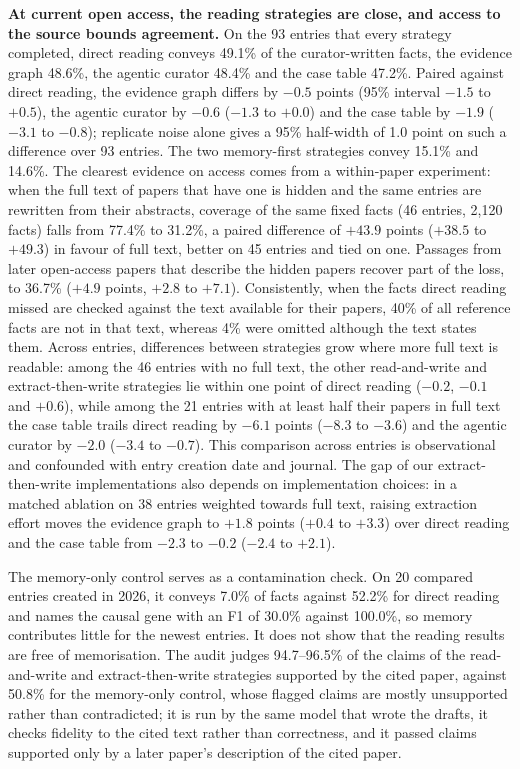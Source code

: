 \documentclass{article} %
\begin{document}
\textbf{At current open access, the reading strategies are close, and access to the source bounds agreement.} On the 93 entries that every strategy completed, direct reading conveys 49.1\% of the curator-written facts, the evidence graph 48.6\%, the agentic curator 48.4\% and the case table 47.2\%. Paired against direct reading, the evidence graph differs by $-0.5$ points (95\% interval $-1.5$ to $+0.5$), the agentic curator by $-0.6$ ($-1.3$ to $+0.0$) and the case table by $-1.9$ ($-3.1$ to $-0.8$); replicate noise alone gives a 95\% half-width of 1.0 point on such a difference over 93 entries. The two memory-first strategies convey 15.1\% and 14.6\%. The clearest evidence on access comes from a within-paper experiment: when the full text of papers that have one is hidden and the same entries are rewritten from their abstracts, coverage of the same fixed facts (46 entries, 2,120 facts) falls from 77.4\% to 31.2\%, a paired difference of $+43.9$ points ($+38.5$ to $+49.3$) in favour of full text, better on 45 entries and tied on one. Passages from later open-access papers that describe the hidden papers recover part of the loss, to 36.7\% ($+4.9$ points, $+2.8$ to $+7.1$). Consistently, when the facts direct reading missed are checked against the text available for their papers, 40\% of all reference facts are not in that text, whereas 4\% were omitted although the text states them. Across entries, differences between strategies grow where more full text is readable: among the 46 entries with no full text, the other read-and-write and extract-then-write strategies lie within one point of direct reading ($-0.2$, $-0.1$ and $+0.6$), while among the 21 entries with at least half their papers in full text the case table trails direct reading by $-6.1$ points ($-8.3$ to $-3.6$) and the agentic curator by $-2.0$ ($-3.4$ to $-0.7$). This comparison across entries is observational and confounded with entry creation date and journal. The gap of our extract-then-write implementations also depends on implementation choices: in a matched ablation on 38 entries weighted towards full text, raising extraction effort moves the evidence graph to $+1.8$ points ($+0.4$ to $+3.3$) over direct reading and the case table from $-2.3$ to $-0.2$ ($-2.4$ to $+2.1$).

The memory-only control serves as a contamination check. On 20 compared entries created in 2026, it conveys 7.0\% of facts against 52.2\% for direct reading and names the causal gene with an F1 of 30.0\% against 100.0\%, so memory contributes little for the newest entries. It does not show that the reading results are free of memorisation. The audit judges 94.7--96.5\% of the claims of the read-and-write and extract-then-write strategies supported by the cited paper, against 50.8\% for the memory-only control, whose flagged claims are mostly unsupported rather than contradicted; it is run by the same model that wrote the drafts, it checks fidelity to the cited text rather than correctness, and it passed claims supported only by a later paper's description of the cited paper.
\end{document}
